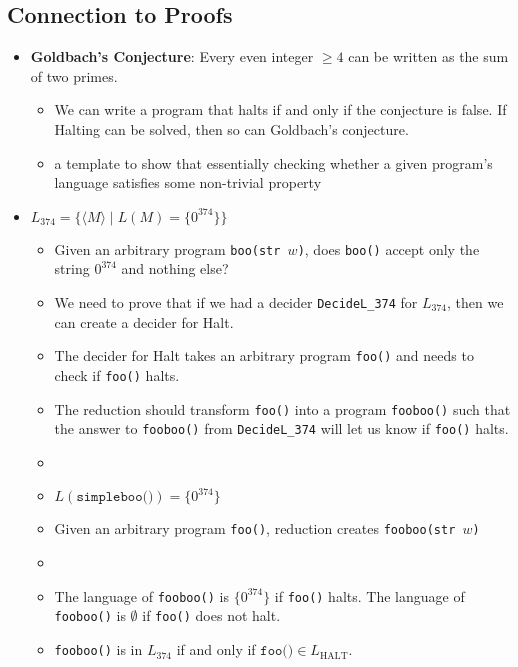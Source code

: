 \subsection{Connection to Proofs}
\begin{itemize}
    \item \textbf{Goldbach's Conjecture}: Every even integer $\geq 4$ can be written as the sum of two primes.
    \begin{itemize}
        \item We can write a program that halts if and only if the conjecture is false. If Halting can be solved, then so can Goldbach's conjecture.
    \end{itemize}
    \begin{itemize}
        \item a template to show that essentially checking whether a given program's language satisfies some non-trivial property
    \end{itemize}
    \item $L_{374} = \{ \langle M \rangle \mid L(M) = \{ 0^{374} \} \}$
    \begin{itemize}
        \item Given an arbitrary program \texttt{boo(str $w$)}, does \texttt{boo()} accept only the string $0^{374}$ and nothing else?
        \item We need to prove that if we had a decider \texttt{DecideL\_374} for $L_{374}$, then we can create a decider for Halt.
        \item The decider for Halt takes an arbitrary program \texttt{foo()} and needs to check if \texttt{foo()} halts.
        \item The reduction should transform \texttt{foo()} into a program \texttt{fooboo()} such that the answer to \texttt{fooboo()} from \texttt{DecideL\_374} will let us know if \texttt{foo()} halts.
        \item[] 
        \item $L(\texttt{simpleboo()}) = \{ 0^{374} \}$
        \item Given an arbitrary program \texttt{foo()}, reduction creates \texttt{fooboo(str $w$)}
        \item[] 
        \item The language of \texttt{fooboo()} is $\{ 0^{374} \}$ if \texttt{foo()} halts. The language of \texttt{fooboo()} is $\emptyset$ if \texttt{foo()} does not halt.
        \item \texttt{fooboo()} is in $L_{374}$ if and only if $\texttt{foo()} \in L_{\text{HALT}}$.

\end{itemize}
\end{itemize}
